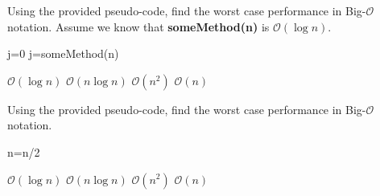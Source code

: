 \documentclass{exam}
\begin{document}
\begin{questions}
\question Using the provided pseudo-code, find the worst case performance in Big-$\mathcal{O}$ notation. Assume we know that \textbf{someMethod(n)} is $\mathcal{O}(\log n)$.
        \begin{algorithm}[H]
        \caption{Some pseudocode with a method in it}\label{algor3}
            \begin{algorithmic}[1] %
                    \State j=0
                        \State j=someMethod(n)
                    \EndFor
                \EndProcedure
            \end{algorithmic}
        \end{algorithm}
    \begin{oneparchoices}
        \choice $\mathcal{O}(\log n)$
        \CorrectChoice $\mathcal{O}(n\log n)$
        \choice $\mathcal{O}(n^{2})$
        \choice $\mathcal{O}(n)$
    \end{oneparchoices}


\question Using the provided pseudo-code, find the worst case performance in Big-$\mathcal{O}$ notation.
        \begin{algorithm}[H]
        \caption{Some more messy pseudocode}\label{algor4}
            \begin{algorithmic}[1]
                        \State n=n/2
                    \EndWhile
                \EndProcedure
            \end{algorithmic}
        \end{algorithm}
    \begin{oneparchoices}
        \CorrectChoice $\mathcal{O}(\log n)$
        \choice $\mathcal{O}(n\log n)$
        \choice $\mathcal{O}(n^{2})$
        \choice $\mathcal{O}(n)$
    \end{oneparchoices}



\end{questions}
\end{document}
